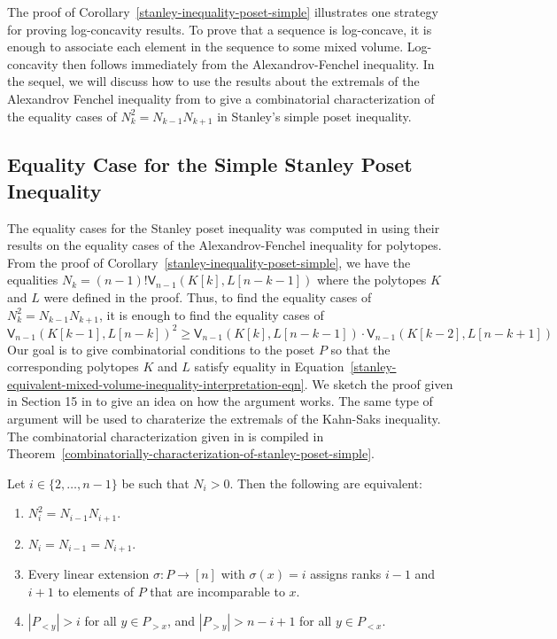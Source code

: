 \documentclass{puthesis-UG}
\begin{document}
The proof of Corollary~\ref{stanley-inequality-poset-simple} illustrates one strategy for proving log-concavity results. To prove that a sequence is log-concave, it is enough to associate each element in the sequence to some mixed volume. Log-concavity then follows immediately from the Alexandrov-Fenchel inequality. In the sequel, we will discuss how to use the results about the extremals of the Alexandrov Fenchel inequality from \cite{shenfeld2022extremals} to give a combinatorial characterization of the equality cases of $N_k^2 = N_{k-1} N_{k+1}$ in Stanley's simple poset inequality. 

\subsection{Equality Case for the Simple Stanley Poset Inequality}

The equality cases for the Stanley poset inequality was computed in \cite{shenfeld2022extremals} using their results on the equality cases of the Alexandrov-Fenchel inequality for polytopes. From the proof of Corollary~\ref{stanley-inequality-poset-simple}, we have the equalities $N_k = (n-1)! \mathsf{V}_{n-1} (K[k], L[n-k-1])$ where the polytopes $K$ and $L$ were defined in the proof. Thus, to find the equality cases of $N_k^2 = N_{k-1} N_{k+1}$, it is enough to find the equality cases of 
\begin{equation} \label{stanley-equivalent-mixed-volume-inequality-interpretation-eqn}
	\mathsf{V}_{n-1}(K[k-1], L[n-k])^2 \geq \mathsf{V}_{n-1}(K[k], L[n-k-1]) \cdot \mathsf{V}_{n-1}(K[k-2], L[n-k+1])
\end{equation}
Our goal is to give combinatorial conditions to the poset $P$ so that the corresponding polytopes $K$ and $L$ satisfy equality in Equation~\ref{stanley-equivalent-mixed-volume-inequality-interpretation-eqn}. We sketch the proof given in Section 15 in \cite{shenfeld2022extremals} to give an idea on how the argument works. The same type of argument will be used to charaterize the extremals of the Kahn-Saks inequality. The combinatorial characterization given in \cite{shenfeld2022extremals} is compiled in Theorem~\ref{combinatorially-characterization-of-stanley-poset-simple}. 

\begin{thm} \label{combinatorially-characterization-of-stanley-poset-simple}
	Let $i \in \{2, \ldots, n-1\}$ be such that $N_i > 0$. Then the following are equivalent:
	\begin{enumerate}[label = (\alph*)]
		\item $N_i^2 = N_{i-1} N_{i+1}$. 
		\item $N_i = N_{i-1} = N_{i+1}$. 
		\item Every linear extension $\sigma : P \to [n]$ with $\sigma(x) = i$ assigns ranks $i-1$ and $i+1$ to elements of $P$ that are incomparable to $x$. 
		\item $|P_{< y}| > i$ for all $y \in P_{> x}$, and $|P_{> y}| > n-i+1$ for all $y \in P_{< x}$. 
	\end{enumerate}
\end{thm}
\end{document}
